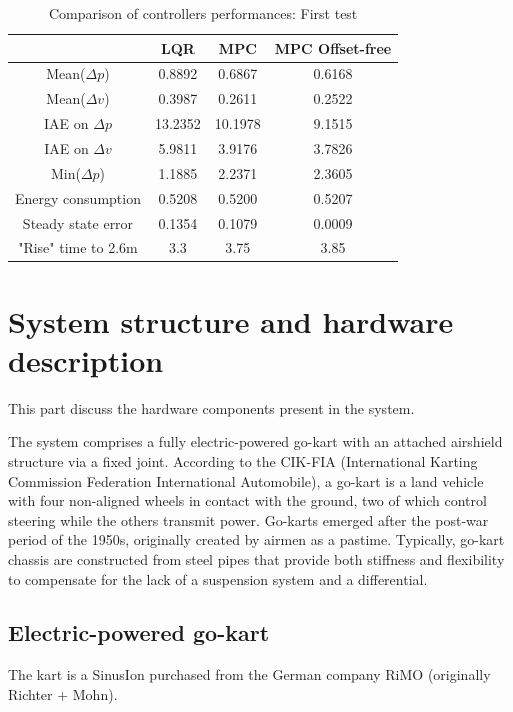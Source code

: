 \documentclass[a4paper,12pt,oneside]{book}
\begin{document}
\begin{table}[htbp]
	\centering
	\caption{Comparison of controllers performances: First test}
	\label{tab:Test1}
	\begin{tabular}{c|c|c|c}
          & LQR & MPC & MPC Offset-free \\
	\hline
	\hline
	Mean($\Delta p$) & 0.8892 & 0.6867 &  0.6168 \\
	Mean($\Delta v$) & 0.3987 & 0.2611 & 0.2522 \\
	IAE on $\Delta p$ & 13.2352 & 10.1978 & 9.1515 \\
	IAE on $\Delta v$ & 5.9811 & 3.9176 & 3.7826 \\
	Min($\Delta p$) & 1.1885 & 2.2371 & 2.3605 \\
	Energy consumption & 0.5208 & 0.5200 & 0.5207 \\
	Steady state error & 0.1354 & 0.1079 & 0.0009 \\
	"Rise" time to 2.6m & 3.3 & 3.75 & 3.85 \\
	\hline
	\end{tabular}
\end{table}





\section{System structure and hardware description}
This part discuss the hardware components present in the system.



The system comprises a fully electric-powered go-kart with an attached airshield structure via a fixed joint. According to the CIK-FIA (International Karting Commission Federation International Automobile), a go-kart is a land vehicle with four non-aligned wheels in contact with the ground, two of which control steering while the others transmit power. Go-karts emerged after the post-war period of the 1950s, originally created by airmen as a pastime. Typically, go-kart chassis are constructed from steel pipes that provide both stiffness and flexibility to compensate for the lack of a suspension system and a differential.

\subsection*{Electric-powered go-kart}
The kart is a SinusIon purchased from the German company RiMO (originally Richter + Mohn). 
\end{document}
